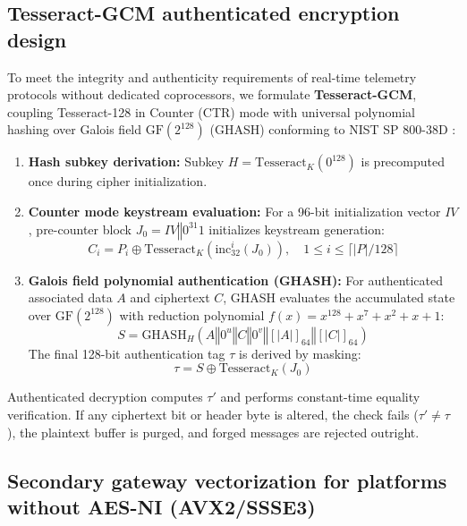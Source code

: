 \documentclass[review,12pt]{elsarticle}
\begin{document}
\subsection{Tesseract-GCM authenticated encryption design}
\label{subsec:gcm_design}
To meet the integrity and authenticity requirements of real-time telemetry protocols without dedicated coprocessors, we formulate \textbf{Tesseract-GCM}, coupling Tesseract-128 in Counter (CTR) mode with universal polynomial hashing over Galois field $\text{GF}(2^{128})$ (GHASH) conforming to NIST SP 800-38D \cite{dworkin2007gcm}:
\begin{enumerate}
    \item \textbf{Hash subkey derivation:} Subkey $H = \text{Tesseract}_K(0^{128})$ is precomputed once during cipher initialization.
    \item \textbf{Counter mode keystream evaluation:} For a 96-bit initialization vector $IV$, pre-counter block $J_0 = IV \mathbin{\Vert} 0^{31}1$ initializes keystream generation:
    \begin{equation}
        C_i = P_i \oplus \text{Tesseract}_K(\text{inc}_{32}^i(J_0)), \quad 1 \le i \le \lceil |P|/128 \rceil
    \end{equation}
    \item \textbf{Galois field polynomial authentication (GHASH):} For authenticated associated data $A$ and ciphertext $C$, GHASH evaluates the accumulated state over $\text{GF}(2^{128})$ with reduction polynomial $f(x) = x^{128} + x^7 + x^2 + x + 1$:
    \begin{equation}
        S = \text{GHASH}_H(A \mathbin{\Vert} 0^u \mathbin{\Vert} C \mathbin{\Vert} 0^v \mathbin{\Vert} [|A|]_{64} \mathbin{\Vert} [|C|]_{64})
    \end{equation}
    The final 128-bit authentication tag $\tau$ is derived by masking:
    \begin{equation}
        \tau = S \oplus \text{Tesseract}_K(J_0)
    \end{equation}
\end{enumerate}
Authenticated decryption computes $\tau'$ and performs constant-time equality verification. If any ciphertext bit or header byte is altered, the check fails ($\tau' \neq \tau$), the plaintext buffer is purged, and forged messages are rejected outright.

\subsection{Secondary gateway vectorization for platforms without AES-NI (AVX2/SSSE3)}
\label{subsec:gateway_simd}
\end{document}
